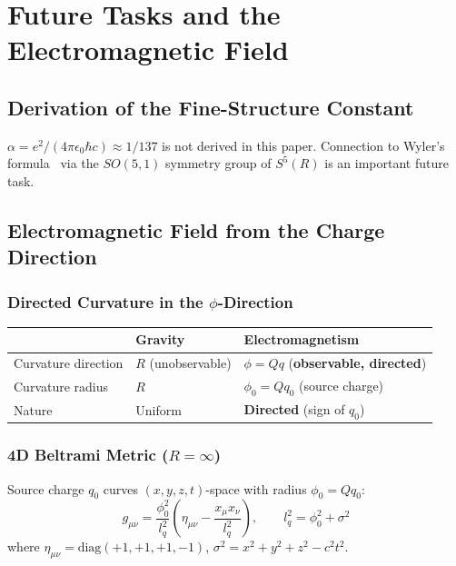 \documentclass[12pt,a4paper]{article}
\begin{document}
\section{Future Tasks and the Electromagnetic Field}

\subsection{Derivation of the Fine-Structure Constant}

$\alpha = e^2/(4\pi\epsilon_0 \hbar c) \approx 1/137$ is not derived in this paper. Connection to Wyler's formula~\cite{Wyler1971} via the $SO(5,1)$ symmetry group of $S^5(R)$ is an important future task.

\subsection{Electromagnetic Field from the Charge Direction}

\subsubsection{Directed Curvature in the $\phi$-Direction}

\begin{center}
\begin{tabular}{lll}
\toprule
 & Gravity & Electromagnetism \\
\midrule
Curvature direction & $R$ (unobservable) & $\phi = Qq$ (\textbf{observable, directed}) \\
Curvature radius & $R$ & $\phi_0 = Qq_0$ (source charge) \\
Nature & Uniform & \textbf{Directed} (sign of $q_0$) \\
\bottomrule
\end{tabular}
\end{center}

\subsubsection{4D Beltrami Metric ($R = \infty$)}

Source charge $q_0$ curves $(x,y,z,t)$-space with radius $\phi_0 = Qq_0$:
\begin{equation}
g_{\mu\nu} = \frac{\phi_0^2}{l_q^2}\left(\eta_{\mu\nu} - \frac{x_\mu x_\nu}{l_q^2}\right), \qquad l_q^2 = \phi_0^2 + \sigma^2 \tag{8.1}
\end{equation}
where $\eta_{\mu\nu} = \text{diag}(+1,+1,+1,-1)$, $\sigma^2 = x^2+y^2+z^2-c^2t^2$.
\end{document}
